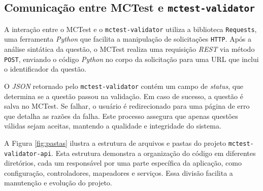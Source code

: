 \subsection{Comunicação entre MCTest e \texttt{mctest-validator}}\label{sec:contexto}

A interação entre o MCTest e o \texttt{mctest-validator} utiliza a biblioteca \texttt{Requests}, uma ferramenta \textit{Python} que facilita a manipulação de solicitações \texttt{HTTP}. Após a análise sintática da questão, o MCTest realiza uma requisição \textit{REST} via método \texttt{POST}, enviando o código \textit{Python} no corpo da solicitação para uma URL que inclui o identificador da questão.

O \textit{JSON} retornado pelo \texttt{mctest-validator} contém um campo de \textit{status}, que determina se a questão passou na validação. Em caso de sucesso, a questão é salva no MCTest. Se falhar, o usuário é redirecionado para uma página de erro que detalha as razões da falha. Este processo assegura que apenas questões válidas sejam aceitas, mantendo a qualidade e integridade do sistema.


A Figura \ref{fig:pastas} ilustra a estrutura de arquivos e pastas do projeto \texttt{mctest-validator-api}. Esta estrutura demonstra a organização do código em diferentes diretórios, cada um responsável por uma parte específica da aplicação, como configuração, controladores, mapeadores e serviços. Essa divisão facilita a manutenção e evolução do projeto.

